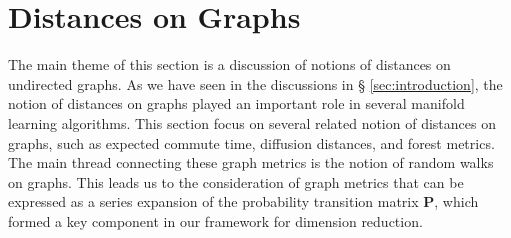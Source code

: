 \documentclass[10pt,twocolumn]{article}
\numberwithin{equation}{section}
\begin{document}
\section{Distances on Graphs}
\label{sec:distances-graphs}
The main theme of this section is a discussion of notions of distances on
undirected graphs. As we have seen in the discussions in \S
\ref{sec:introduction}, the notion of distances on graphs played an
important role in several manifold learning algorithms. This section
focus on several related notion of distances on graphs, such as
expected commute time, diffusion distances, and forest metrics. The
main thread connecting these graph metrics is the notion of random
walks on graphs. This leads us to the consideration of graph metrics
that can be expressed as a series expansion of the probability
transition matrix $\mathbf{P}$, which formed a key component in our
framework for dimension reduction. 
\end{document}
